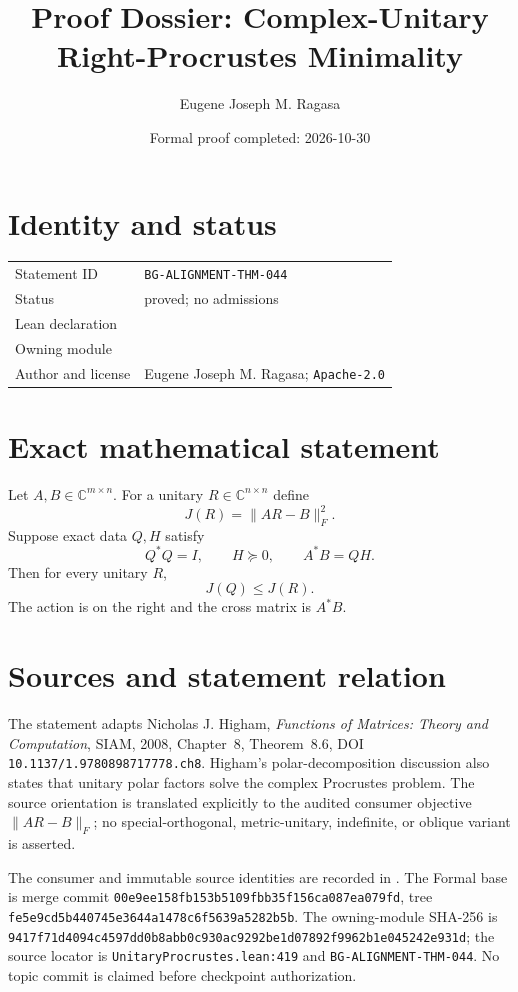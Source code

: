 \documentclass[10pt]{article}
\title{Proof Dossier: Complex-Unitary Right-Procrustes Minimality}
\author{Eugene Joseph M. Ragasa}
\date{Formal proof completed: 2026-10-30}
\begin{document}
\raggedright
\maketitle

\section{Identity and status}
\begin{tabularx}{\textwidth}{@{}lY@{}}
\toprule
Statement ID & \texttt{BG-ALIGNMENT-THM-044} \\
Status & proved; no admissions \\
Lean declaration &  \\
Owning module &  \\
Author and license & Eugene Joseph M. Ragasa; \texttt{Apache-2.0} \\
\bottomrule
\end{tabularx}

\section{Exact mathematical statement}
Let $A,B\in\mathbb C^{m\times n}$. For a unitary $R\in\mathbb C^{n\times n}$ define
\[
  J(R)=\lVert AR-B\rVert_F^2.
\]
Suppose exact data $Q,H$ satisfy
\[
  Q^*Q=I,\qquad H\succeq0,\qquad A^*B=QH.
\]
Then for every unitary $R$,
\[
  J(Q)\le J(R).
\]
The action is on the right and the cross matrix is $A^*B$.

\section{Sources and statement relation}
The statement adapts Nicholas J. Higham, \emph{Functions of Matrices: Theory and
Computation}, SIAM, 2008, Chapter~8, Theorem~8.6, DOI
\texttt{10.1137/1.9780898717778.ch8}. Higham's polar-decomposition discussion also states that
unitary polar factors solve the complex Procrustes problem. The source orientation is translated
explicitly to the audited consumer objective $\lVert AR-B\rVert_F$; no special-orthogonal,
metric-unitary, indefinite, or oblique variant is asserted.

The consumer and immutable source identities are recorded in . The
Formal base is merge commit \texttt{00e9ee158fb153b5109fbb35f156ca087ea079fd}, tree
\texttt{fe5e9cd5b440745e3644a1478c6f5639a5282b5b}. The owning-module SHA-256 is
\texttt{9417f71d4094c4597dd0b8abb0c930ac9292be1d07892f9962b1e045242e931d}; the source locator is
\texttt{UnitaryProcrustes.lean:419} and \texttt{BG-ALIGNMENT-THM-044}. No topic commit is claimed
before checkpoint authorization.
\end{document}

